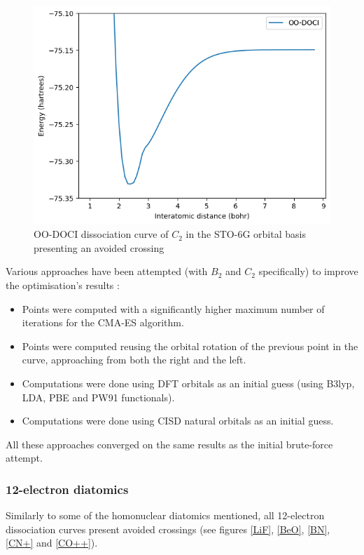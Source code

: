 \documentclass[twoside,twocolumn,9pt]{article}
\begin{document}
\begin{figure}
  \includegraphics[width=\linewidth]{C2.png}
  \caption{OO-DOCI dissociation curve of $C_2$ in the STO-6G orbital basis presenting an avoided crossing}\label{C2}
\end{figure}

Various approaches have been attempted (with $B_2$ and $C_2$ specifically) to improve the optimisation's results :

\begin{itemize}
  \item Points were computed with a significantly higher maximum number of iterations for the CMA-ES algorithm.
  \item Points were computed reusing the orbital rotation of the previous point in the curve, approaching from both the right and the left.
  \item Computations were done using DFT orbitals as an initial guess (using B3lyp, LDA, PBE and PW91 functionals).
  \item Computations were done using CISD natural orbitals as an initial guess.
\end{itemize}

All these approaches converged on the same results as the initial brute-force attempt.

\subsubsection{12-electron diatomics}

Similarly to some of the homonuclear diatomics mentioned, all 12-electron dissociation curves present avoided crossings (see figures \ref{LiF}, \ref{BeO}, \ref{BN}, \ref{CN+} and \ref{CO++}).
\end{document}
